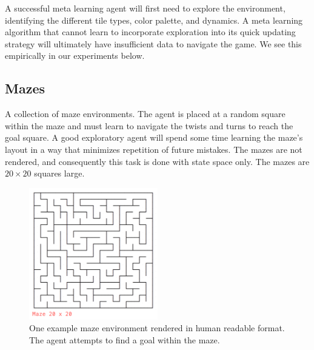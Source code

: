 \documentclass{article} %
\begin{document}
    A successful meta learning agent will first need to explore the environment, identifying the different tile types, color palette, and dynamics. A meta learning algorithm that cannot learn to incorporate exploration into its quick updating strategy will ultimately have insufficient data to navigate the game. We see this empirically in our experiments below. 
    
    
\subsection{Mazes}
A collection of maze environments. The agent is placed at a random square within the maze and must learn to navigate the twists and turns to reach the goal square. A good exploratory agent will spend some time learning the maze's layout in a way that minimizes repetition of future mistakes. The mazes are not rendered, and consequently this task is done with state space only. The mazes are $20 \times 20$ squares large.   
\begin{figure}[H]
\begin{center}
\includegraphics[width=0.5\textwidth]{envs/maze_screenshot.png} 
\end{center}
\caption{One example maze environment rendered in human readable format. The agent attempts to find a goal within the maze.}
\end{figure} 

\end{document}
